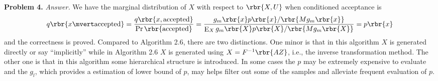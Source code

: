 \documentclass[english, nochinese]{pnote}
\DeclareMathOperator\oppr{\mathrm{Pr}}
\DeclareMathOperator\ope{\mathrm{E}}
\begin{document}
\textbf{Problem 4.} \textit{Answer.} We have the marginal distribution of $X$ with respect to $ \rbr{ X, U } $ when conditioned acceptance is
\begin{equation}
q \rbr{ x \mvert \text{accepted} } = \frac{ q \rbr{ x, \text{accepted} } }{ \oppr \rbr{\text{accepted}} } = \frac{ g_m \rbr{x} p \rbr{x} / \rbr{ M g_m \rbr{x} } }{ \ope_X g_m \rbr{X} p \rbr{X} / \rbr{ M g_m \rbr{X} } } = p \rbr{x}
\end{equation}
and the correctness is proved. Compared to Algorithm 2.6, there are two distinctions. One minor is that in this algorithm $X$ is generated directly or say ``implicitly'' while in Algorithm 2.6 $X$ is generated using $ X = F^{-1} \rbr{ A Z } $, i.e., the inverse transformation method. The other one is that in this algorithm some hierarchical structure is introduced. In some cases the $p$ may be extremely expensive to evaluate and the $g_l$, which provides a estimation of lower bound of $p$, may helps filter out some of the samples and alleviate frequent evaluation of $p$.
\end{document}
